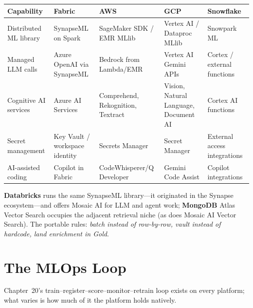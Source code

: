 \begin{center}
\footnotesize
\begin{tabular}{@{}p{2.8cm}p{3.2cm}p{3.2cm}p{3.2cm}p{3.2cm}@{}}
\toprule
\textbf{Capability} & \textbf{Fabric} & \textbf{AWS} & \textbf{GCP} & \textbf{Snowflake} \\
\midrule
Distributed ML library & SynapseML on Spark & SageMaker SDK / EMR MLlib & Vertex AI / Dataproc MLlib & Snowpark ML \\
Managed LLM calls & Azure OpenAI via SynapseML & Bedrock from Lambda/EMR & Vertex AI Gemini APIs & Cortex / external functions \\
Cognitive AI services & Azure AI Services & Comprehend, Rekognition, Textract & Vision, Natural Language, Document AI & Cortex AI functions \\
Secret management & Key Vault / workspace identity & Secrets Manager & Secret Manager & External access integrations \\
AI-assisted coding & Copilot in Fabric & CodeWhisperer/Q Developer & Gemini Code Assist & Copilot integrations \\
\bottomrule
\end{tabular}
\end{center}

\noindent \textbf{Databricks} runs the same SynapseML library---it originated in the Synapse
ecosystem---and offers Mosaic AI for LLM and agent work; \textbf{MongoDB} Atlas Vector Search
occupies the adjacent retrieval niche (as does Mosaic AI Vector Search). The portable rules:
\emph{batch instead of row-by-row, vault instead of hardcode, land enrichment in Gold}.

\section{The MLOps Loop}
%
Chapter~20's train--register--score--monitor--retrain loop exists on every platform; what
varies is how much of it the platform holds natively.

